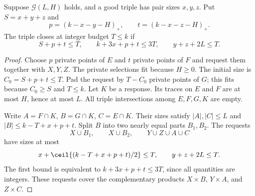 \begin{lemma}\label{lem:gapempty}
Suppose $\mathcal G(L,H)$ holds, and a good triple has pair sizes $x,y,z$.
Put $S=x+y+z$ and
\[
 p=(k-x-y-H)_+,\qquad t=(k-x-z-H)_+.
\]
The triple closes at integer budget $T\le k$ if
\begin{equation}\label{eq:g0exact}
 S+p+t\le T,\qquad k+3x+p+t\le3T,\qquad y+z+2L\le T.
\end{equation}
\end{lemma}
\begin{proof}
Choose $p$ private points of $E$ and $t$ private points of $F$ and
request them together with $X,Y,Z$. The private selections fit because
$H\ge0$. The initial size is $C_0=S+p+t\le T$. Pad the request by
$T-C_0$ private points of $G$; this fits because $C_0\ge S$ and $T\le k$.
Let $K$ be a response. Its traces on $E$ and $F$ are at most $H$, hence
at most $L$. All triple intersections among $E,F,G,K$ are empty.

Write $A=F\cap K$, $B=G\cap K$, $C=E\cap K$. Their sizes satisfy
$|A|,|C|\le L$ and $|B|\le k-T+x+p+t$.
Split $B$ into two nearly equal parts $B_1,B_2$. The requests
\[
 X\cup B_1,\qquad X\cup B_2,\qquad Y\cup Z\cup A\cup C
\]
have sizes at most
\[
 x+\ceil{(k-T+x+p+t)/2}\le T,\qquad y+z+2L\le T.
\]
The first bound is equivalent to $k+3x+p+t\le3T$, since all quantities
are integers. These requests cover the complementary products
$X\times B$, $Y\times A$, and $Z\times C$.
\end{proof}

